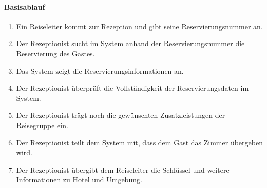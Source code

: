 \paragraph{Basisablauf}
\begin{enumerate}
	\item Ein \Gls{Reiseleiter} kommt zur \Gls{Rezeption} und gibt seine \Gls{Reservierungsnummer} an.
	\item Der \Gls{Rezeptionist} sucht im System anhand der \Gls{Reservierungsnummer} die \Gls{Reservierung} des \Gls{Gast}es.
	\item Das System zeigt die Reservierungsinformationen an.
	\item Der \Gls{Rezeptionist} überprüft die Vollständigkeit der Reservierungsdaten im System.
	\item Der \Gls{Rezeptionist} trägt noch die gewünschten \Gls{Zusatzleistung}en der Reisegruppe ein.
	\item Der \Gls{Rezeptionist} teilt dem System mit, dass dem \Gls{Gast} das \Gls{Zimmer} übergeben wird.
	\item Der \Gls{Rezeptionist} übergibt dem Reiseleiter die Schlüssel und weitere Informationen zu Hotel und Umgebung.
\end{enumerate}


